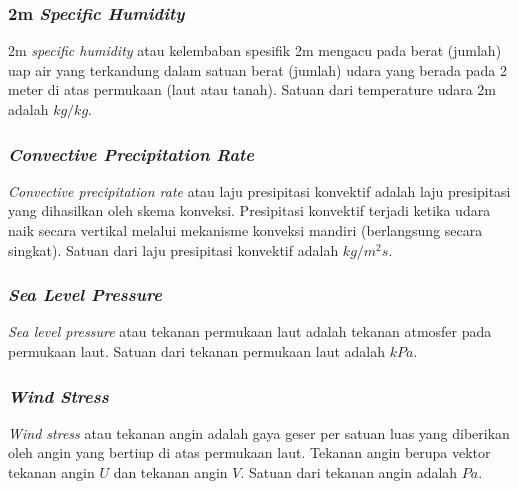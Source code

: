\begin{spacing}{1.5}
\subsubsection[2m \textit{Specific Humidity}]{2m \textit{Specific Humidity}}
	 2m \textit{specific humidity} atau kelembaban spesifik 2m mengacu pada berat (jumlah) uap air yang terkandung dalam satuan berat (jumlah) udara yang berada pada 2 meter di atas permukaan (laut atau tanah). Satuan dari temperature udara 2m adalah $kg/kg$.
\subsubsection[\textit{Convective Precipitation Rate}]{\textit{Convective Precipitation Rate}}
	\textit{Convective precipitation rate} atau laju presipitasi konvektif adalah laju presipitasi yang dihasilkan oleh skema konveksi. Presipitasi konvektif terjadi ketika udara naik secara vertikal melalui mekanisme konveksi mandiri (berlangsung secara singkat). Satuan dari laju presipitasi konvektif adalah $kg/m^2s$.
\subsubsection[\textit{Sea Level Pressure}]{\textit{Sea Level Pressure}}
	\textit{Sea level pressure} atau tekanan permukaan laut adalah tekanan atmosfer pada permukaan laut. Satuan dari tekanan permukaan laut adalah $kPa$.
\subsubsection[\textit{Wind Stress}]{\textit{Wind Stress}}
	\textit{Wind stress} atau tekanan angin adalah gaya geser per satuan luas yang diberikan oleh angin yang bertiup di atas permukaan laut. Tekanan angin berupa vektor tekanan angin $U$ dan tekanan angin $V$. Satuan dari tekanan angin adalah $Pa$.
\end{spacing}
\vspace{-0.5pc}
